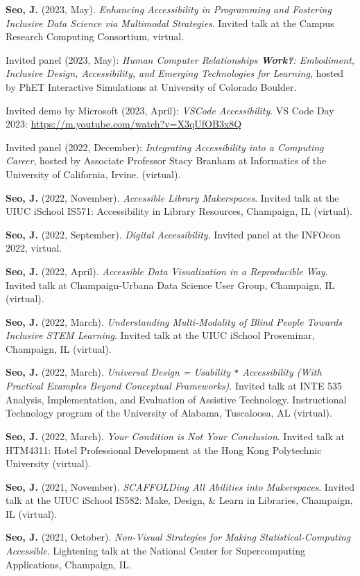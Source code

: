 \documentclass[11pt,a4paper,]{awesome-cv}
\begin{document}
\textbf{Seo, J.} (2023, May). \emph{Enhancing Accessibility in
Programming and Fostering Inclusive Data Science via Multimodal
Strategies}. Invited talk at the Campus Research Computing Consortium,
virtual.

Invited panel (2023, May): \emph{Human Computer Relationships
\textbf{Work?}: Embodiment, Inclusive Design, Accessibility, and
Emerging Technologies for Learning}, hosted by PhET Interactive
Simulations at University of Colorado Boulder.

Invited demo by Microsoft (2023, April): \emph{VSCode Accessibility}. VS
Code Day 2023: \url{https://m.youtube.com/watch?v=X3qUfOB3x8Q}

Invited panel (2022, December): \emph{Integrating Accessibility into a
Computing Career}, hosted by Associate Professor Stacy Branham at
Informatics of the University of California, Irvine. (virtual).

\textbf{Seo, J.} (2022, November). \emph{Accessible Library
Makerspaces}. Invited talk at the UIUC iSchool IS571: Accessibility in
Library Resources, Champaign, IL (virtual).

\textbf{Seo, J.} (2022, September). \emph{Digital Accessibility}.
Invited panel at the INFOcon 2022, virtual.

\textbf{Seo, J.} (2022, April). \emph{Accessible Data Visualization in a
Reproducible Way}. Invited talk at Champaign-Urbana Data Science User
Group, Champaign, IL (virtual).

\textbf{Seo, J.} (2022, March). \emph{Understanding Multi-Modality of
Blind People Towards Inclusive STEM Learning}. Invited talk at the UIUC
iSchool Proseminar, Champaign, IL (virtual).

\textbf{Seo, J.} (2022, March). \emph{Universal Design = Usability
\texttt{*} Accessibility (With Practical Examples Beyond Conceptual
Frameworks)}. Invited talk at INTE 535 Analysis, Implementation, and
Evaluation of Assistive Technology. Instructional Technology program of
the University of Alabama, Tuscaloosa, AL (virtual).

\textbf{Seo, J.} (2022, March). \emph{Your Condition is Not Your
Conclusion}. Invited talk at HTM4311: Hotel Professional Development at
the Hong Kong Polytechnic University (virtual).

\textbf{Seo, J.} (2021, November). \emph{SCAFFOLDing All Abilities into
Makerspaces}. Invited talk at the UIUC iSchool IS582: Make, Design, \&
Learn in Libraries, Champaign, IL (virtual).

\textbf{Seo, J.} (2021, October). \emph{Non-Visual Strategies for Making
Statistical-Computing Accessible}. Lightening talk at the National
Center for Supercomputing Applications, Champaign, IL.
\end{document}
